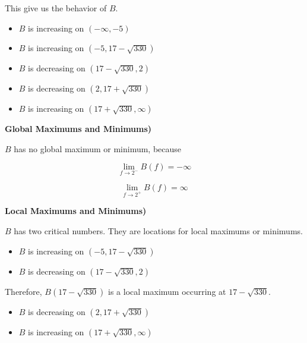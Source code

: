 \documentclass{ximera}
\begin{document}
\begin{example}
This give us the behavior of $B$.





\begin{itemize}
  \item $B$ is increasing on $(-\infty, -5)$
  \item $B$ is increasing on $(-5, 17 - \sqrt{330})$
  \item $B$ is decreasing on $(17 - \sqrt{330}, 2)$
  \item $B$ is decreasing on $(2, 17 + \sqrt{330})$
  \item $B$ is increasing on $(17 + \sqrt{330}, \infty)$
\end{itemize}



















\textbf{Global Maximums and Minimums)}


$B$ has no global maximum or minimum, because


\[
\lim\limits_{f \to 2^-} B(f) = -\infty 
\]




\[
\lim\limits_{f \to 2^+} B(f) = \infty 
\]





\textbf{Local Maximums and Minimums)}


$B$ has two critical numbers.  They are locations for local maximums or minimums.






\begin{itemize}
  \item $B$ is increasing on $(-5, 17 - \sqrt{330})$
  \item $B$ is decreasing on $(17 - \sqrt{330}, 2)$
\end{itemize}


Therefore, $B(17 - \sqrt{330})$ is a local maximum occurring at $17 - \sqrt{330}$.





\begin{itemize}
  \item $B$ is decreasing on $(2, 17 + \sqrt{330})$
  \item $B$ is increasing on $(17 + \sqrt{330}, \infty)$
\end{itemize}




\end{example}
\end{document}
